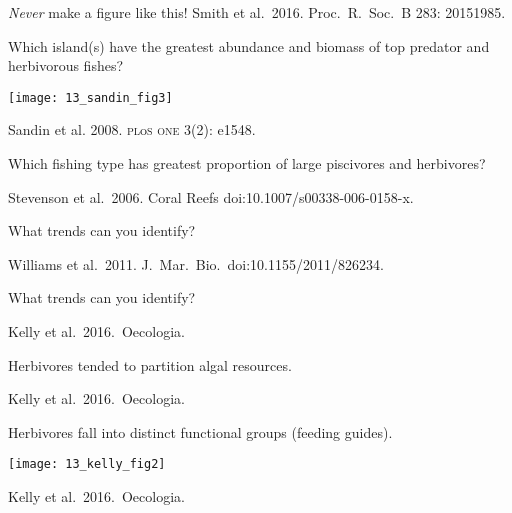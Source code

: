 \documentclass[t,handout]{beamer}  %
\begin{document}
%
{
\begin{frame}[b]

	\tiny \emph{Never} make a figure like this! \hfill Smith et al.~2016. Proc.~R.~Soc.~B 283: 20151985.

\end{frame}
}
%
\begin{frame}[t]{Which island(s) have the greatest abundance and biomass of top predator and herbivorous fishes?}

	\texttt{[image: 13\_sandin\_fig3]}

	\vfilll
	
	\hfill \tiny Sandin et al. 2008. \textsc{pl}o\textsc{s one} 3(2): e1548.

\end{frame}
%
{
\begin{frame}[b]{Which fishing type has greatest proportion of large piscivores and herbivores?}

	\tiny \hfill Stevenson et al.~2006. Coral Reefs doi:10.1007/s00338-006-0158-x.

\end{frame}
}
%
%
{
\begin{frame}[b]{What trends can you identify?}

	\tiny \hfill Williams et al.~2011. J.~Mar.~Bio.~doi:10.1155/2011/826234.

\end{frame}
}
%
{
	\begin{frame}[b]{What trends can you identify?}
	
	\hfill \tiny Kelly et al.~2016.~Oecologia. %
	
\end{frame}
}
%
{
\begin{frame}[b]{Herbivores tended to partition algal resources.}
	
	\hfill \tiny Kelly et al.~2016.~Oecologia. %
	
\end{frame}
}
%
\begin{frame}[b]{Herbivores fall into distinct functional groups (feeding guides).}

{\centering
	\texttt{[image: 13\_kelly\_fig2]}\par
}

\hfill \tiny Kelly et al.~2016.~Oecologia. %

\end{frame}
\end{document}
